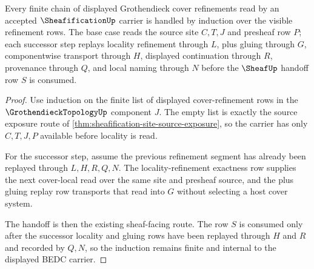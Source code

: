 \begin{theorem}
\label{thm:sheafification-grothendieck-locality-induction}
Every finite chain of displayed Grothendieck cover refinements read by an accepted $\SheafificationUp$ carrier is handled by induction over the visible refinement rows. The base case reads the source site $C,T,J$ and presheaf row $P$; each successor step replays locality refinement through $L$, plus gluing through $G$, componentwise transport through $H$, displayed continuation through $R$, provenance through $Q$, and local naming through $N$ before the $\SheafUp$ handoff row $S$ is consumed.
\end{theorem}
\begin{proof}
Use induction on the finite list of displayed cover-refinement rows in the $\GrothendieckTopologyUp$ component $J$. The empty list is exactly the source exposure route of \autoref{thm:sheafification-site-source-exposure}, so the carrier has only $C,T,J,P$ available before locality is read.

For the successor step, assume the previous refinement segment has already been replayed through $L,H,R,Q,N$. The locality-refinement exactness row supplies the next cover-local read over the same site and presheaf source, and the plus gluing replay row transports that read into $G$ without selecting a host cover system.

The handoff is then the existing sheaf-facing route. The row $S$ is consumed only after the successor locality and gluing rows have been replayed through $H$ and $R$ and recorded by $Q,N$, so the induction remains finite and internal to the displayed BEDC carrier.
\end{proof}

